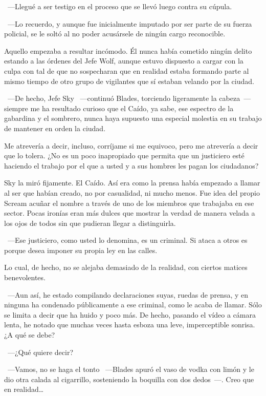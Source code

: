 ~---Llegué a ser testigo en el proceso que se llevó luego contra su cúpula.

~---Lo recuerdo, y aunque fue inicialmente imputado por ser parte de su fuerza policial, se le soltó al no poder acusársele de ningún cargo reconocible.

Aquello empezaba a resultar incómodo. Él nunca había cometido ningún delito estando a las órdenes del Jefe Wolf, aunque estuvo dispuesto a cargar con la culpa con tal de que no sospecharan que en realidad estaba formando parte al mismo tiempo de otro grupo de vigilantes que sí estaban velando por la ciudad.

~---De hecho, Jefe Sky ~---continuó Blades, torciendo ligeramente la cabeza~--- siempre me ha resultado curioso que el Caído, ya sabe, ese espectro de la gabardina y el sombrero, nunca haya supuesto una especial molestia en su trabajo de mantener en orden la ciudad.

\rquoti Me atrevería a decir, incluso, corríjame si me equivoco, pero me atrevería a decir que lo tolera. ¿No es un poco inapropiado que permita que un justiciero esté haciendo el trabajo por el que a usted y a sus hombres les pagan los ciudadanos?

Sky la miró fijamente. El Caído. Así era como la prensa había empezado a llamar al ser que habían creado, no por casualidad, ni mucho menos. Fue idea del propio Scream acuñar el nombre a través de uno de los miembros que trabajaba en ese sector. Pocas ironías eran más dulces que mostrar la verdad de manera velada a los ojos de todos sin que pudieran llegar a distinguirla.

~---Ese justiciero, como usted lo denomina, es un criminal. Si ataca a otros es porque desea imponer su propia ley en las calles.

Lo cual, de hecho, no se alejaba demasiado de la realidad, con ciertos matices benevolentes.

~---Aun así, he estado compilando declaraciones suyas, ruedas de prensa, y en ninguna ha condenado públicamente a ese criminal, como le acaba de llamar. Sólo se limita a decir que ha huido y poco más. De hecho, pasando el vídeo a cámara lenta, he notado que muchas veces hasta esboza una leve, imperceptible sonrisa. ¿A qué se debe?

~---¿Qué quiere decir?

~---Vamos, no se haga el tonto ~---Blades apuró el vaso de vodka con limón y le dio otra calada al cigarrillo, sosteniendo la boquilla con dos dedos~---. Creo que en realidad\dots

